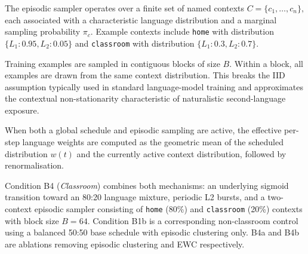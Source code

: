 \documentclass[11pt]{article}
\begin{document}
The episodic sampler operates over a finite set of named contexts
\(
C = \{c_1,\ldots,c_n\},
\)
each associated with a characteristic language distribution and a marginal
sampling probability \(\pi_c\). Example contexts include
\texttt{home}
with distribution
\(
\{L_1:0.95, L_2:0.05\}
\)
and
\texttt{classroom}
with distribution
\(
\{L_1:0.3, L_2:0.7\}.
\)

Training examples are sampled in contiguous blocks of size \(B\). Within a
block, all examples are drawn from the same context distribution. This breaks
the IID assumption typically used in standard language-model training and
approximates the contextual non-stationarity characteristic of naturalistic
second-language exposure.

When both a global schedule and episodic sampling are active, the effective
per-step language weights are computed as the geometric mean of the scheduled
distribution \(w(t)\) and the currently active context distribution, followed
by renormalisation.

Condition B4 (\emph{Classroom}) combines both mechanisms: an underlying
sigmoid transition toward an 80:20 language mixture, periodic L2 bursts, and a
two-context episodic sampler consisting of \texttt{home} (80\%) and
\texttt{classroom} (20\%) contexts with block size \(B=64\). Condition B1b is
a corresponding non-classroom control using a balanced 50:50 base schedule
with episodic clustering only. B4a and B4b are ablations removing episodic
clustering and EWC respectively.
\end{document}
